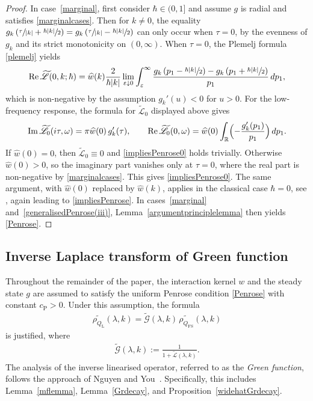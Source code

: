 \documentclass[JEP,XML,SOM,Unicode]{cedram}
\theoremstyle{plain}
\theoremstyle{remark}
\newcommand{\Bbr}[1]{\Bigl(#1 \Bigr)}
\newcommand{\R}{\mathbb{R}}
\begin{document}
\begin{proof}
In case~\eqref{marginal}, first consider $\hbar\in(0,1]$ and assume \( g \) is radial and satisfies \eqref{marginalcases}. Then for \( k \neq 0 \), the equality $g_k\left( \sfrac{\tau}{\abs{k}} + \sfrac{\hbar \abs{k}}{2} \right)
=
g_k\left( \sfrac{\tau}{\abs{k}} - \sfrac{\hbar \abs{k}}{2} \right)$
can only occur when \( \tau = 0 \), by the evenness of \( g_k \) and its strict monotonicity on $(0,\infty)$. When \( \tau = 0 \), the Plemelj formula \eqref{plemelj} yields
\[
\Re \widetilde{\mathscr L}(0,k;\hbar)
= \widehat w(k)\frac{2}{\hbar \abs{k}}
\lim_{\varepsilon \downarrow 0} \int_\varepsilon^\infty
\frac{
g_k\left(p_1 - \sfrac{\hbar \abs{k}}{2}\right)
- g_k\left(p_1 + \sfrac{\hbar \abs{k}}{2}\right)
}{p_1} \, dp_1,
\]
which is non-negative by the assumption \( g_k'(u) < 0 \) for \( u > 0 \). For the low-frequency response, the formula for \( \widetilde{\mathscr L}_0 \) displayed above gives
\[
\Im \widetilde{\mathscr L}_0(i\tau,\omega) = \pi\widehat w(0)\,g_k'(\tau),
\qquad
\Re \widetilde{\mathscr L}_0(0,\omega) = \widehat w(0)\int_{\R}\Bbr{-\frac{g_k'(p_1)}{p_1}}\,dp_1.
\]
If \( \widehat w(0)=0 \), then \( \widetilde{\mathscr L}_0\equiv0 \) and \eqref{impliesPenrose0} holds trivially. Otherwise \( \widehat w(0)>0 \), so the imaginary part vanishes only at \( \tau = 0 \), where the real part is non-negative by \eqref{marginalcases}. This gives \eqref{impliesPenrose0}. The same argument, with \( \widehat w(0) \) replaced by \( \widehat w(k) \), applies in the classical case \( \hbar = 0 \), see \eg \cite{bed-mas-mou-2016}, again leading to \eqref{impliesPenrose}. In cases~\eqref{marginal} and~\eqref{generalisedPenrose(iii)}, Lemma~\ref{argumentprinciplelemma} then yields \eqref{Penrose}.
\end{proof}

\subsection{Inverse Laplace transform of Green function}
Throughout the remainder of the paper, the interaction kernel \( w \) and the steady state \( g \) are assumed to satisfy the uniform Penrose condition \eqref{Penrose} with constant \( {c_{\mathrm{P}}} > 0 \). Under this assumption, the formula
\begin{align}
\widetilde{\rho_{Q_{\mathrm{L}}}}(\lambda,k) = \widetilde{\mathscr{G}}(\lambda,k)\,\widetilde{\rho_{Q_{\mathrm{FS}}}}(\lambda,k) \label{1/1+L}
\end{align}
is justified, where
\begin{align}
\widetilde{\mathscr{G}}(\lambda,k) := \frac{1}{1 + \widetilde{\mathscr{L}}(\lambda,k)}. \label{definitionofwidetildeG}
\end{align}
The analysis of the inverse linearised operator, referred to as the \textit{Green function}, follows the approach of Nguyen and You~\cite{NguyenYou2023}. Specifically, this includes Lemma~\ref{mflemma}, Lemma~\ref{Grdecay}, and Proposition~\ref{widehatGrdecay}.
\end{document}
